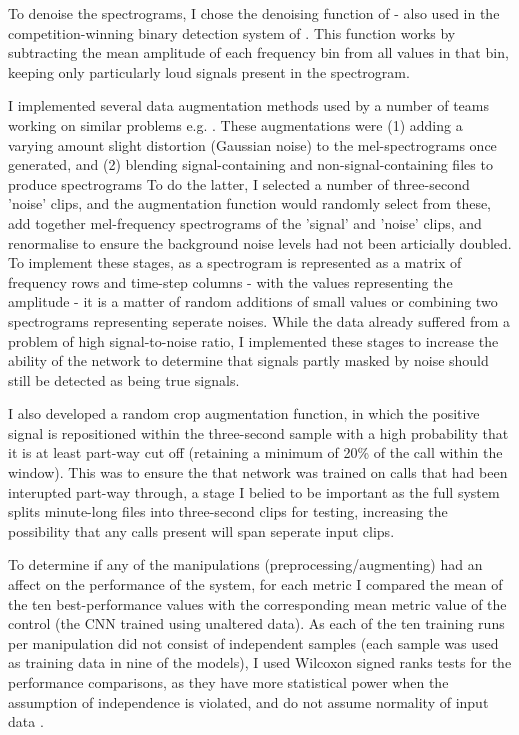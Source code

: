 \documentclass[11pt]{article}
\begin{document}
To denoise the spectrograms, I chose the denoising function of \cite{aide2013real} - also used in the competition-winning binary detection system of \cite{kahl2017large}. This function works by subtracting the mean amplitude of each frequency bin from all values in that bin, keeping only particularly loud signals present in the spectrogram. 


I implemented several data augmentation methods used by a number of teams working on similar problems e.g. \cite{kahl2017large,sprengel2016audio}. These augmentations were (1) adding a varying amount slight distortion (Gaussian noise) to the mel-spectrograms once generated, and (2) blending signal-containing and non-signal-containing files to produce spectrograms  To do the latter, I selected a number of three-second 'noise' clips, and the augmentation function would randomly select from these, add together mel-frequency spectrograms of the 'signal' and 'noise' clips, and renormalise to ensure the background noise levels had not been articially doubled. To implement these stages, as a spectrogram is represented as a matrix of frequency rows and time-step columns - with the values representing the amplitude - it is a matter of random additions of small values or combining two spectrograms representing seperate noises. While the data already suffered from a problem of high signal-to-noise ratio, I implemented these stages to increase the ability of the network to determine that signals partly masked by noise should still be detected as being true signals.   

I also developed a random crop augmentation function, in which the positive signal is repositioned within the three-second sample with a high probability that it is at least part-way cut off (retaining a minimum of 20\% of the call within the window). This was to ensure the that network was trained on calls that had been interupted part-way through, a stage I belied to be important as the full system splits minute-long files into three-second clips for testing, increasing the possibility that any calls present will span seperate input clips. 

To determine if any of the manipulations (preprocessing/augmenting) had an affect on the performance of the system, for each metric I compared the mean of the ten best-performance values with the corresponding mean metric value of the control (the CNN trained using unaltered data). As each of the ten training runs per manipulation did not consist of independent samples (each sample was used as training data in nine of the models), I used Wilcoxon signed ranks tests for the performance comparisons, as they have more statistical power when the assumption of independence is violated, and do not assume normality of input data \citep{brownlee2018statistical}. 
\end{document}
